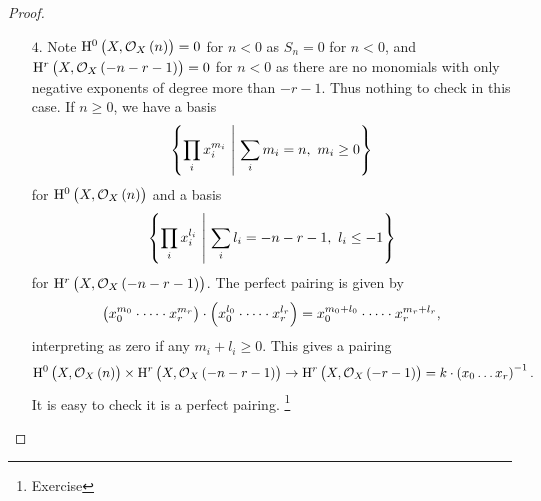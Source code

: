 \begin{proof}
\begin{itemize}
\pagebreak

\item[$ 4 $.] Note $ \H^0\br{X, \OOO_X\br{n}} = 0 $ for $ n < 0 $ as $ S_n = 0 $ for $ n < 0 $, and $ \H^r\br{X, \OOO_X\br{-n - r - 1}} = 0 $ for $ n < 0 $ as there are no monomials with only negative exponents of degree more than $ -r - 1 $. Thus nothing to check in this case. If $ n \ge 0 $, we have a basis
$$ \cbr{\prod_i x_i^{m_i} \st \sum_i m_i = n, \ m_i \ge 0} $$
for $ \H^0\br{X, \OOO_X\br{n}} $ and a basis
$$ \cbr{\prod_i x_i^{l_i} \st \sum_i l_i = -n - r - 1, \ l_i \le -1} $$
for $ \H^r\br{X, \OOO_X\br{-n - r - 1}} $. The perfect pairing is given by
$$ \br{x_0^{m_0} \cdot \dots \cdot x_r^{m_r}} \cdot \br{x_0^{l_0} \cdot \dots \cdot x_r^{l_r}} = x_0^{m_0 + l_0} \cdot \dots \cdot x_r^{m_r + l_r}, $$
interpreting as zero if any $ m_i + l_i \ge 0 $. This gives a pairing
$$ \H^0\br{X, \OOO_X\br{n}} \times \H^r\br{X, \OOO_X\br{-n - r - 1}} \to \H^r\br{X, \OOO_X\br{-r - 1}} = k \cdot \br{x_0 \dots x_r}^{-1}. $$
It is easy to check it is a perfect pairing. \footnote{Exercise}



\end{itemize}
\end{proof}

